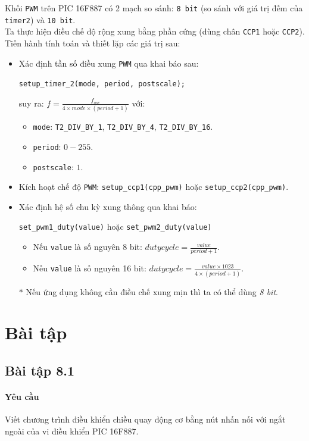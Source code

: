 Khối \verb|PWM| trên PIC 16F887 có 2 mạch so sánh: \verb|8 bit| (so sánh với giá trị đếm của \verb|timer2|) và \verb|10 bit|.\\

Ta thực hiện điều chế độ rộng xung bằng phần cứng (dùng chân \verb|CCP1| hoặc \verb|CCP2|). Tiến hành tính toán và thiết lặp các giá trị sau:
\begin{itemize}
\item Xác định tần số điều xung \verb|PWM| qua khai báo sau:

\verb|setup_timer_2(mode, period, postscale);|

suy ra: $\displaystyle f = \frac{f_{osc}}{4 \times mode \times \left({period+1}\right)}$ với:
\begin{itemize}
\item \verb|mode|: \verb|T2_DIV_BY_1|, \verb|T2_DIV_BY_4|, \verb|T2_DIV_BY_16|.
\item \verb|period|: $0-255$.
\item \verb|postscale|: $1$.
\end{itemize}
\item Kích hoạt chế độ \verb|PWM|: \verb|setup_ccp1(cpp_pwm)| hoặc \verb|setup_ccp2(cpp_pwm)|.
\item Xác định hệ số chu kỳ xung thông qua khai báo:


\verb|set_pwm1_duty(value)| hoặc \verb|set_pwm2_duty(value)|
\begin{itemize}
\item Nếu \verb|value| là số nguyên 8 bit: $\displaystyle duty cycle = \frac{value}{period + 1}$.
\item Nếu \verb|value| là số nguyên 16 bit: $\displaystyle duty cycle = \frac{value \times 1023}{4 \times \left({period + 1}\right)}$.
\end{itemize}
\item[$\ast$] Nếu ứng dụng không cần điều chế xung mịn thì ta có thể dùng \textit{8 bit}.
\end{itemize}
\section{Bài tập}
\subsection{Bài tập 8.1}
\paragraph{Yêu cầu}Viết chương trình điều khiển chiều quay động cơ bằng nút nhấn nối với ngắt ngoài của vi điều khiển PIC 16F887.
